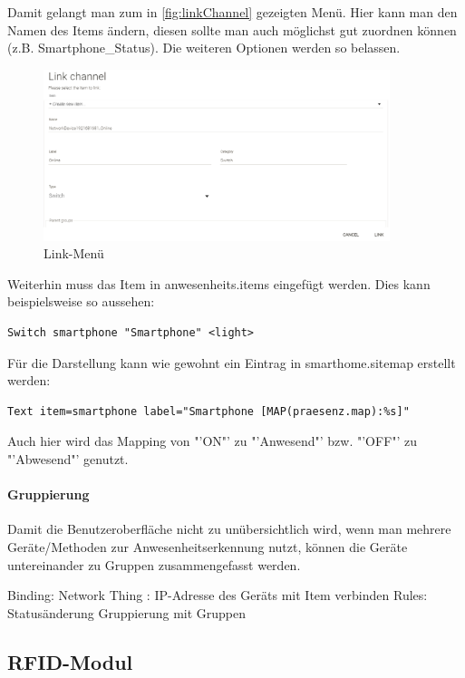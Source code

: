 Damit gelangt man zum in \autoref{fig:linkChannel} gezeigten Menü. Hier kann man den Namen des Items ändern, diesen sollte man auch möglichst gut zuordnen können (z.B. Smartphone\_Status). Die weiteren Optionen werden so belassen.

\begin{figure}[H]
	\centering
	\includegraphics[width=0.9\textwidth]{Bilder/linkChannel.PNG}
	\caption{Link-Menü}
	\label{fig:linkChannel}
\end{figure}

Weiterhin muss das Item in anwesenheits.items eingefügt werden. Dies kann beispielsweise so aussehen:

\begin{lstlisting}
Switch smartphone "Smartphone" <light>
\end{lstlisting}

Für die Darstellung kann wie gewohnt ein Eintrag in smarthome.sitemap erstellt werden:
\begin{lstlisting}
Text item=smartphone label="Smartphone [MAP(praesenz.map):%s]" 
\end{lstlisting}

Auch hier wird das Mapping von "'ON"' zu "'Anwesend"' bzw. "'OFF"' zu "'Abwesend"' genutzt.

\paragraph{Gruppierung}
Damit die Benutzeroberfläche nicht zu unübersichtlich wird, wenn man mehrere Geräte/Methoden zur Anwesenheitserkennung nutzt, können die Geräte untereinander zu Gruppen zusammengefasst werden.

Binding: Network
Thing : IP-Adresse des Geräts
mit Item verbinden
Rules: Statusänderung
Gruppierung mit Gruppen

\subsection{RFID-Modul}

